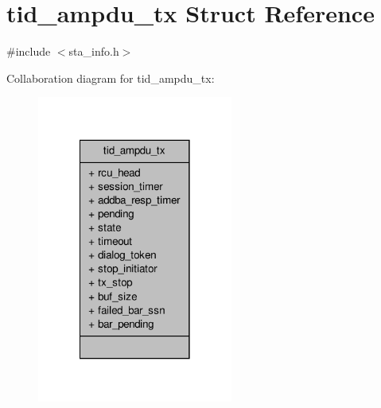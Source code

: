 \hypertarget{structtid__ampdu__tx}{\section{tid\-\_\-ampdu\-\_\-tx Struct Reference}
\label{structtid__ampdu__tx}
}


{\ttfamily \#include $<$sta\-\_\-info.\-h$>$}



Collaboration diagram for tid\-\_\-ampdu\-\_\-tx\-:
\nopagebreak
\begin{figure}[H]
\begin{center}
\leavevmode
\includegraphics[width=182pt]{structtid__ampdu__tx__coll__graph}
\end{center}
\end{figure}
